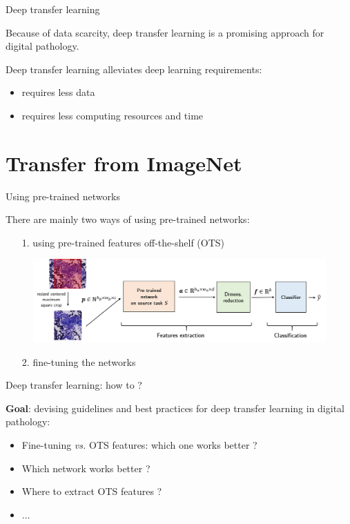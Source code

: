 \documentclass{beamer}
\begin{document}
\begin{frame}{Deep transfer learning}
	
	\begin{center}
		\large
		Because of {data scarcity}, {deep transfer learning} is a {promising approach} for digital pathology.
	\end{center}
	
	\vfill
	{Deep transfer learning} alleviates {deep learning} requirements: 
	
	
	\begin{itemize}
		\item requires {less data}
		\item requires {less computing resources} and {time}
	\end{itemize}

\end{frame}

\section{Transfer from ImageNet}

\begin{frame}{Using pre-trained networks}	


	There are mainly two ways of using {pre-trained networks}:
\vfill		
	\begin{itemize}
		\item[1.] using pre-trained {features off-the-shelf} (OTS)
	\end{itemize}
		\begin{figure}
			\includegraphics[scale=0.35]{images/offtheshelf_schema.png}
		\end{figure}
	
	\begin{itemize}
		\item[2.] {fine-tuning} the networks
	\end{itemize}
\end{frame}

\begin{frame}{Deep transfer learning: how to ?}

\textbf{Goal}: devising {guidelines and best practices} for deep transfer learning in digital pathology:
\vfill

\begin{itemize}
	\item {Fine-tuning \textit{vs.} OTS features}: which one works better ? 
 	\item Which {network} works better ? 
 	\item {Where to extract} OTS features ? 
 	\item ...
\end{itemize} 
\end{frame}
\end{document}
